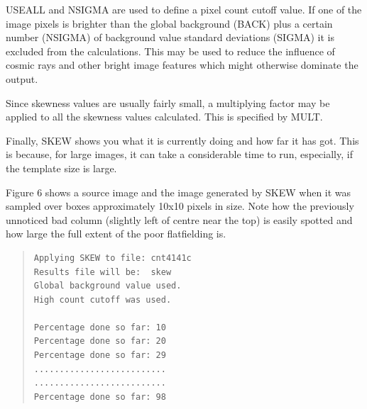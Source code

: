 \documentclass[twoside,11pt]{article}
\newenvironment{myquote}{\begin{quote}\begin{small}}{\end{small}\end{quote}}
\begin{document}
USEALL and NSIGMA are used to define a pixel count cutoff value. If one of the
image pixels is brighter than the global background (BACK) plus a certain 
number (NSIGMA) of background value standard deviations (SIGMA) it is excluded from the
calculations. This may be used to reduce the influence of cosmic rays and
other bright image features which might otherwise dominate the output.

Since skewness values are usually fairly small, a multiplying factor may be
applied to all the skewness values calculated. This is specified by MULT.

Finally, SKEW shows you what it is currently doing and how
far it has got. This is because, for large images, it can
take a considerable time to run, especially, if the template size is large.

Figure 6 shows a source image and the image generated by SKEW when it was sampled
over boxes approximately 10x10 pixels in size. Note how the previously 
unnoticed bad column (slightly left of centre near the top) is easily spotted
and how large the full extent of the poor flatfielding is.

\begin{myquote}
\begin{verbatim}
Applying SKEW to file: cnt4141c
Results file will be:  skew
Global background value used.
High count cutoff was used.
 
Percentage done so far: 10
Percentage done so far: 20
Percentage done so far: 29
..........................
..........................
Percentage done so far: 98
\end{verbatim}
\end{myquote}
\end{document}
